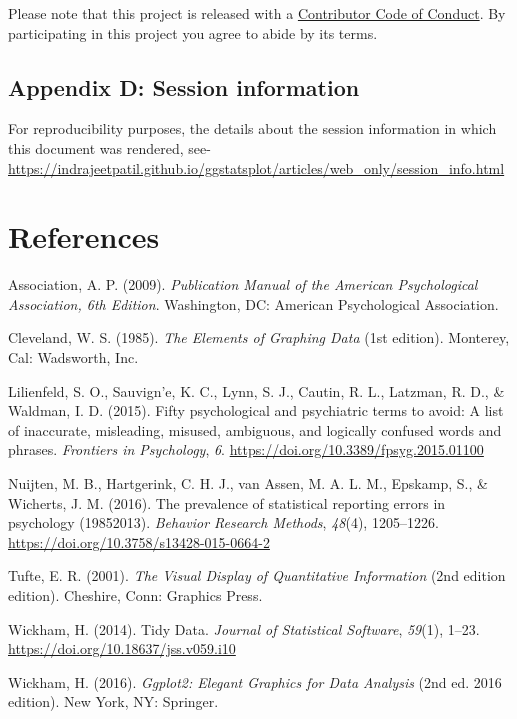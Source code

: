 \documentclass[]{article}
\begin{document}
Please note that this project is released with a
\href{https://github.com/IndrajeetPatil/ggstatsplot/blob/master/CODE_OF_CONDUCT.md}{Contributor Code of Conduct}. By participating in this project you agree to abide by its terms.

\hypertarget{appendix-d-session-information}{%
\subsection{Appendix D: Session information}\label{appendix-d-session-information}}

For reproducibility purposes, the details about the session information in which
this document was rendered, see-
\url{https://indrajeetpatil.github.io/ggstatsplot/articles/web_only/session_info.html}

\newpage

\hypertarget{references}{%
\section*{References}\label{references}}

\hypertarget{refs}{}
\leavevmode\hypertarget{ref-associationPublicationManualAmerican2009}{}%
Association, A. P. (2009). \emph{Publication Manual of the American Psychological Association, 6th Edition}. Washington, DC: American Psychological Association.

\leavevmode\hypertarget{ref-clevelandElementsGraphingData1985}{}%
Cleveland, W. S. (1985). \emph{The Elements of Graphing Data} (1st edition). Monterey, Cal: Wadsworth, Inc.

\leavevmode\hypertarget{ref-lilienfeldFiftyPsychologicalPsychiatric2015}{}%
Lilienfeld, S. O., Sauvign\a'e, K. C., Lynn, S. J., Cautin, R. L., Latzman, R. D., \& Waldman, I. D. (2015). Fifty psychological and psychiatric terms to avoid: A list of inaccurate, misleading, misused, ambiguous, and logically confused words and phrases. \emph{Frontiers in Psychology}, \emph{6}. \url{https://doi.org/10.3389/fpsyg.2015.01100}

\leavevmode\hypertarget{ref-nuijtenPrevalenceStatisticalReporting2016}{}%
Nuijten, M. B., Hartgerink, C. H. J., van Assen, M. A. L. M., Epskamp, S., \& Wicherts, J. M. (2016). The prevalence of statistical reporting errors in psychology (19852013). \emph{Behavior Research Methods}, \emph{48}(4), 1205--1226. \url{https://doi.org/10.3758/s13428-015-0664-2}

\leavevmode\hypertarget{ref-tufteVisualDisplayQuantitative2001}{}%
Tufte, E. R. (2001). \emph{The Visual Display of Quantitative Information} (2nd edition edition). Cheshire, Conn: Graphics Press.

\leavevmode\hypertarget{ref-wickhamTidyData2014}{}%
Wickham, H. (2014). Tidy Data. \emph{Journal of Statistical Software}, \emph{59}(1), 1--23. \url{https://doi.org/10.18637/jss.v059.i10}

\leavevmode\hypertarget{ref-wickhamGgplot2ElegantGraphics2016}{}%
Wickham, H. (2016). \emph{Ggplot2: Elegant Graphics for Data Analysis} (2nd ed. 2016 edition). New York, NY: Springer.
\end{document}
